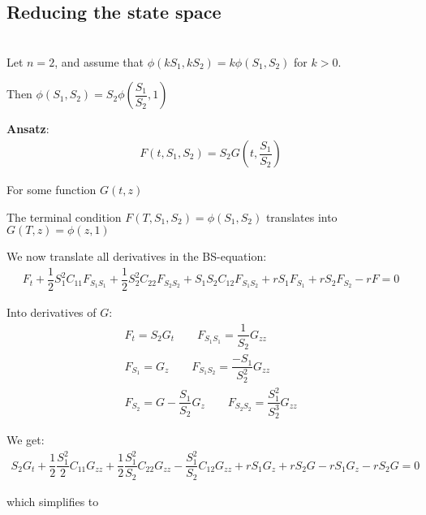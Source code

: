 \subsection{Reducing the state space}\hfill\\
\noindent Let $n=2$, and assume that $\phi(kS_1,kS_2) = k\phi(S_1,S_2)$ for $k>0$.\par
\noindent Then $\phi(S_1,S_2) = S_2\phi\left(\dfrac{S_1}{S_2},1\right)$
\par\bigskip
\noindent\textbf{Ansatz}:
\begin{equation*}
  \begin{gathered}
    F(t,S_1,S_2) = S_2G\left(t,\dfrac{S_1}{S_2}\right)
  \end{gathered}
\end{equation*}\par
\noindent For some function $G(t,z)$
\par\bigskip
\noindent The terminal condition $F(T,S_1,S_2) = \phi(S_1,S_2)$ translates into $G(T,z) = \phi(z,1)$\par
\noindent We now translate all derivatives in the BS-equation:
\begin{equation*}
  \begin{gathered}
    F_t+\dfrac{1}{2}S_1^2C_{11}F_{S_1S_1}+\dfrac{1}{2}S_2^2C_{22}F_{S_2S_2}+S_1S_2C_{12}F_{S_1S_2}+rS_1F_{S_1}+rS_2F_{S_2}-rF=0
  \end{gathered}
\end{equation*}\par
\noindent Into derivatives of $G:$
\begin{equation*}
  \begin{gathered}
    F_t = S_2G_t\qquad F_{S_1S_1} = \dfrac{1}{S_2}G_{zz}\\
    F_{S_1} = G_z\qquad F_{S_1S_2} = \dfrac{-S_1}{S_2^2}G_{zz}\\
    F_{S_2} = G-\dfrac{S_1}{S_2}G_z\qquad F_{S_2S_2} =\dfrac{S_1^2}{S_2^3}G_{zz}
  \end{gathered}
\end{equation*}\par
\noindent We get:
\begin{equation*}
  \begin{gathered}
    S_2G_t+\dfrac{1}{2}\dfrac{S_1^2}{2}C_{11}G_{zz}+\dfrac{1}{2}\dfrac{S_1^2}{S_2}C_{22}G_{zz}-\dfrac{S_1^2}{S_2}C_{12}G_{zz}+rS_1G_z+rS_2G-rS_1G_z-rS_2G=0
  \end{gathered}
\end{equation*}\par
\noindent which simplifies to
